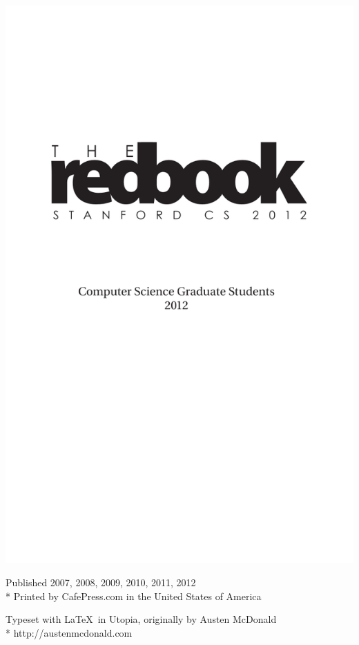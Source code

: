 \documentclass[10pt]{book}
\newenvironment{fullpage}{%
  \begin{list}{}{%
    \setlength{\topmargin}{-1in}
    \setlength{\textheight}{8in}
    \setlength{\topsep}{0pt}%
    \setlength{\leftmargin}{-.6in}%
    \setlength{\listparindent}{\parindent}%
    \setlength{\itemindent}{\parindent}%
    \setlength{\parsep}{\parskip}%
  }%
  \item[]}{\end{list}}
\begin{document}
\thispagestyle{empty}
\mbox{}
\newpage

\thispagestyle{empty}
\begin{fullpage}
\includegraphics{2012-redbook-titlepage.pdf}
\end{fullpage}
\vfil\eject

\vspace*{5in}
{\small
\noindent Published 2007, 2008, 2009, 2010, 2011, 2012\\*
Printed by CafePress.com in the United States of America

\noindent Typeset with \LaTeX\ in Utopia, originally by Austen McDonald\\*
http://austenmcdonald.com
}
\thispagestyle{empty}
\vfil\eject
\end{document}

